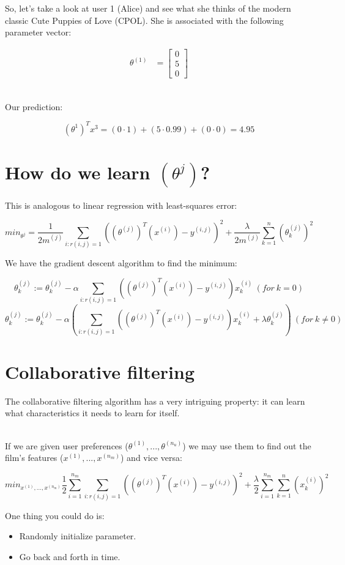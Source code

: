 \documentclass{article}
\begin{document}
So, let's take a look at user 1 (Alice) and see what she thinks of the modern classic Cute Puppies of Love (CPOL). She is associated with the following parameter vector:

\begin{align*}
  \theta^{(1)} & = \begin{bmatrix}
    0 \\
    5 \\
    0
  \end{bmatrix}
\end{align*}

~\\
Our prediction:

$$(\theta^1)^Tx^3 = (0\cdot1)+(5\cdot0.99)+(0\cdot0)=4.95$$

\section*{How do we learn $(\theta^j)$?}

This is analogous to linear regression with least-squares error:

$$min_{\theta^j} = \frac{1}{2m^{(j)}}\sum_{i:r(i,j)=1}((\theta^{(j)})^T(x^{(i)})-y^{(i,j)})^2+\frac{\lambda}{2m^{(j)}}\sum_{k=1}^{n}(\theta_k^{(j)})^2$$

We have the gradient descent algorithm to find the minimum:

$$\theta_k^{(j)} := \theta_k^{(j)}-\alpha \sum_{i:r(i,j)=1}((\theta^{(j)})^T(x^{(i)})-y^{(i,j)})x_k^{(i)}\ (for\ k=0)$$
$$\theta_k^{(j)} := \theta_k^{(j)}-\alpha( \sum_{i:r(i,j)=1}((\theta^{(j)})^T(x^{(i)})-y^{(i,j)})x_k^{(i)} + \lambda \theta_k^{(j)})\ (for\ k\neq0)$$

\section*{Collaborative filtering}
The collaborative filtering algorithm has a very intriguing property: it can learn what characteristics it needs to learn for itself.

~\\
If we are given user preferences ($\theta^{(1)}, ...,\theta^{(n_u)}$) we may use them to find out the film's features ($x^{(1)}, ...,x^{(n_m)}$) and vice versa:

$$min_{x^{(1)}, ...,x^{(n_m)}} \frac{1}{2} \sum_{i=1}^{n_m} \sum_{i:r(i,j)=1}((\theta^{(j)})^T(x^{(i)})-y^{(i,j)})^2+\frac{\lambda}{2}\sum_{i=1}^{n_m}\sum_{k=1}^{n}(x_k^{(i)})^2$$

One thing you could do is:
\begin{itemize}
  \item Randomly initialize parameter.
  \item Go back and forth in time.
\end{itemize}
\end{document}

